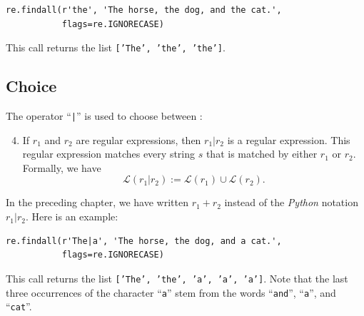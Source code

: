 \begin{verbatim}
re.findall(r'the', 'The horse, the dog, and the cat.',
           flags=re.IGNORECASE)
\end{verbatim}

\noindent
This call returns the list \texttt{['The', 'the', 'the']}.

\subsection{Choice}
The operator ``\texttt{|}'' is used to choose between :
\begin{enumerate}
\setcounter{enumi}{3}
\item If $r_1$ and $r_2$ are regular expressions, then $r_1\texttt{|}r_2$ is a regular expression.  This regular
      expression matches every string $s$ that is matched by either $r_1$ or $r_2$.  Formally, we have
      $$\mathcal{L}(r_1\texttt{|}r_2) := \mathcal{L}(r_1) \cup \mathcal{L}(r_2).$$
\end{enumerate}
In the preceding chapter, we have written $r_1 + r_2$ instead of the \textsl{Python} notation
$r_1\texttt{|}r_2$.  Here is an example:

\begin{verbatim}
re.findall(r'The|a', 'The horse, the dog, and a cat.', 
           flags=re.IGNORECASE)
\end{verbatim}

\noindent
This call returns the list \texttt{['The', 'the', 'a', 'a', 'a']}.  Note that the last three occurrences of the
character ``\texttt{a}'' stem from the words ``\texttt{and}'', ``\texttt{a}'', and ``\texttt{cat}''.

